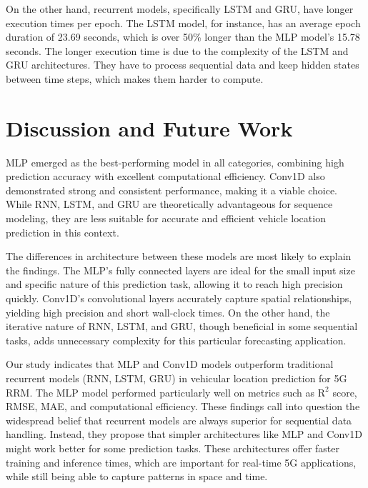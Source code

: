 \documentclass[journal,onecolumn]{IEEEtran}
\begin{document}
{On the other hand, recurrent models, specifically LSTM and GRU, have longer execution times per epoch. The LSTM model, for instance, has an average epoch duration of 23.69 seconds, which is over 50\% longer than the MLP model's 15.78 seconds. The longer execution time is due to the complexity of the LSTM and GRU architectures. They have to process sequential data and keep hidden states between time steps, which makes them harder to compute.
\clearpage

\section{Discussion and Future Work} \label{discussions}
MLP emerged as the best-performing model in all categories, combining high prediction accuracy with excellent computational efficiency. Conv1D also demonstrated strong and consistent performance, making it a viable choice. While RNN, LSTM, and GRU are theoretically advantageous for sequence modeling, they are less suitable for accurate and efficient vehicle location prediction in this context.

The differences in architecture between these models are most likely to explain the findings. The MLP's fully connected layers are ideal for the small input size and specific nature of this prediction task, allowing it to reach high precision quickly. Conv1D's convolutional layers accurately capture spatial relationships, yielding high precision and short wall-clock times. On the other hand, the iterative nature of RNN, LSTM, and GRU, though beneficial in some sequential tasks, adds unnecessary complexity for this particular forecasting application. 

Our study indicates that MLP and Conv1D models outperform traditional recurrent models (RNN, LSTM, GRU) in vehicular location prediction for 5G RRM. The MLP model performed particularly well on metrics such as $\text{R}^2$ score, RMSE, MAE, and computational efficiency. These findings call into question the widespread belief that recurrent models are always superior for sequential data handling. Instead, they propose that simpler architectures like MLP and Conv1D might work better for some prediction tasks. These architectures offer faster training and inference times, which are important for real-time 5G applications, while still being able to capture patterns in space and time.

}
\end{document}
